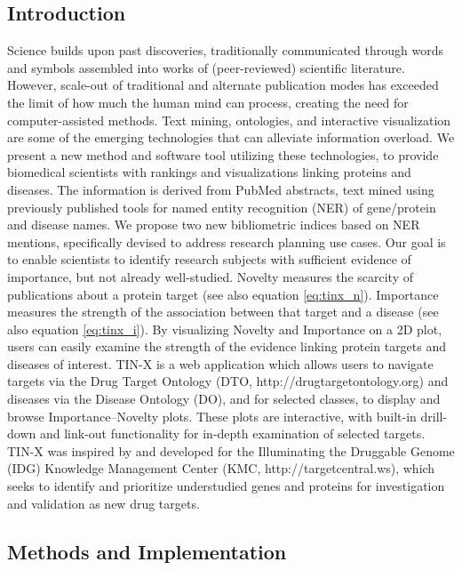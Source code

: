 \subsection{Introduction}

Science builds upon past discoveries, traditionally communicated through words and symbols assembled into works of (peer-reviewed) scientific literature. However, scale-out of traditional and alternate publication modes has exceeded the limit of how much the human mind can process, creating the need for computer-assisted methods\cite{Hunter2006-om}. Text mining, ontologies, and interactive visualization are some of the emerging technologies that can alleviate information overload. We present a new method and software tool utilizing these technologies, to provide biomedical scientists with rankings and visualizations linking proteins and diseases.  The information is derived from PubMed abstracts, text mined using previously published tools for named entity recognition (NER) of gene/protein and disease names\cite{Pletscher-Frankild2015-oo,Szklarczyk2015-bl}. We propose two new bibliometric indices based on NER mentions, specifically devised to address research planning use cases. Our goal is to enable scientists to identify research subjects with sufficient evidence of importance, but not already well-studied. Novelty measures the scarcity of publications about a protein target (see also equation \ref{eq:tinx_n}). Importance measures the strength of the association between that target and a disease (see also equation \ref{eq:tinx_i}). By visualizing Novelty and Importance on a 2D plot, users can easily examine the strength of the evidence linking protein targets and diseases of interest. TIN-X is a web application which allows users to navigate targets via the Drug Target Ontology (DTO, http://drugtargetontology.org) and diseases via the Disease Ontology (DO)\cite{Kibbe2015-li}, and for selected classes, to display and browse Importance–Novelty plots. These plots are interactive, with built-in drill-down and link-out functionality for in-depth examination of selected targets. TIN-X was inspired by and developed for the Illuminating the Druggable Genome (IDG) Knowledge Management Center (KMC, http://targetcentral.ws), which seeks to identify and prioritize understudied genes and proteins for investigation and validation as new drug targets.

\subsection{Methods and Implementation}

